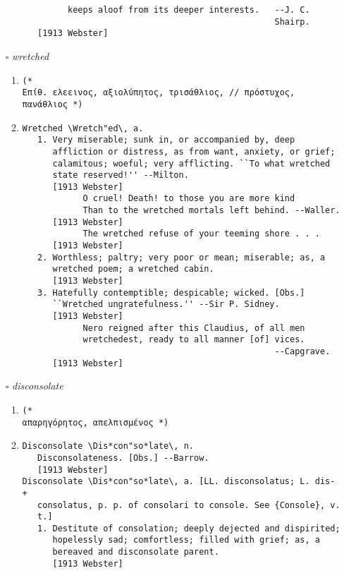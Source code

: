 \documentclass{article}
\begin{document}
\begin{itemize}
\begin{enumerate}
{\begin{lstlisting}
         keeps aloof from its deeper interests.   --J. C.
                                                  Shairp.
   [1913 Webster]
\end{lstlisting}}
\end{enumerate}
\item[$\square$] \emph{ wretched }
\begin{enumerate}
\item{
\begin{lstlisting}
(* 
Επίθ. ελεεινος, αξιολύπητος, τρισάθλιος, // πρόστυχος, πανάθλιος *)
\end{lstlisting}}
\item{
\begin{lstlisting}
Wretched \Wretch"ed\, a.
   1. Very miserable; sunk in, or accompanied by, deep
      affliction or distress, as from want, anxiety, or grief;
      calamitous; woeful; very afflicting. ``To what wretched
      state reserved!'' --Milton.
      [1913 Webster]
            O cruel! Death! to those you are more kind
            Than to the wretched mortals left behind. --Waller.
      [1913 Webster]
            The wretched refuse of your teeming shore . . .
      [1913 Webster]
   2. Worthless; paltry; very poor or mean; miserable; as, a
      wretched poem; a wretched cabin.
      [1913 Webster]
   3. Hatefully contemptible; despicable; wicked. [Obs.]
      ``Wretched ungratefulness.'' --Sir P. Sidney.
      [1913 Webster]
            Nero reigned after this Claudius, of all men
            wretchedest, ready to all manner [of] vices.
                                                  --Capgrave.
      [1913 Webster]
\end{lstlisting}}
\end{enumerate}
\item[$\square$] \emph{ disconsolate }
\begin{enumerate}
\item{
\begin{lstlisting}
(* 
απαρηγόρητος, απελπισμένος *)
\end{lstlisting}}
\item{
\begin{lstlisting}
Disconsolate \Dis*con"so*late\, n.
   Disconsolateness. [Obs.] --Barrow.
   [1913 Webster]
Disconsolate \Dis*con"so*late\, a. [LL. disconsolatus; L. dis- +
   consolatus, p. p. of consolari to console. See {Console}, v.
   t.]
   1. Destitute of consolation; deeply dejected and dispirited;
      hopelessly sad; comfortless; filled with grief; as, a
      bereaved and disconsolate parent.
      [1913 Webster]

\end{lstlisting}}
\end{enumerate}
\end{itemize}
\end{document}
